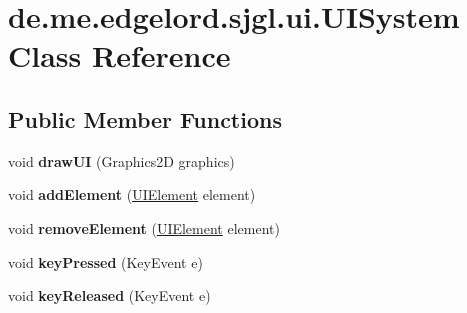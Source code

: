 \hypertarget{classde_1_1me_1_1edgelord_1_1sjgl_1_1ui_1_1_u_i_system}{}\section{de.\+me.\+edgelord.\+sjgl.\+ui.\+U\+I\+System Class Reference}
\label{classde_1_1me_1_1edgelord_1_1sjgl_1_1ui_1_1_u_i_system}
\subsection*{Public Member Functions}
\begin{DoxyCompactItemize}
\item 
\mbox{\label{classde_1_1me_1_1edgelord_1_1sjgl_1_1ui_1_1_u_i_system_a906d4136dc8dde32cad40616159b901e}} 
void {\bfseries draw\+UI} (Graphics2D graphics)
\item 
\mbox{\label{classde_1_1me_1_1edgelord_1_1sjgl_1_1ui_1_1_u_i_system_a4e3a1b1b30c7058e3b6e5ac652e350e9}} 
void {\bfseries add\+Element} (\mbox{\hyperlink{classde_1_1me_1_1edgelord_1_1sjgl_1_1ui_1_1_u_i_element}{U\+I\+Element}} element)
\item 
\mbox{\label{classde_1_1me_1_1edgelord_1_1sjgl_1_1ui_1_1_u_i_system_a32f50deb917aadabdb4773c253f3f950}} 
void {\bfseries remove\+Element} (\mbox{\hyperlink{classde_1_1me_1_1edgelord_1_1sjgl_1_1ui_1_1_u_i_element}{U\+I\+Element}} element)
\item 
\mbox{\label{classde_1_1me_1_1edgelord_1_1sjgl_1_1ui_1_1_u_i_system_a25bf26c895cda9d4176c4d1eaf884fc6}} 
void {\bfseries key\+Pressed} (Key\+Event e)
\item 
\mbox{\label{classde_1_1me_1_1edgelord_1_1sjgl_1_1ui_1_1_u_i_system_ab98f23cbe8b8bbb7f35bf48c2d866616}} 
void {\bfseries key\+Released} (Key\+Event e)
\item 
\mbox{\label{classde_1_1me_1_1edgelord_1_1sjgl_1_1ui_1_1_u_i_system_a934ebd8e325533c45d314e7a86871f52}} 

\end{DoxyCompactItemize}
